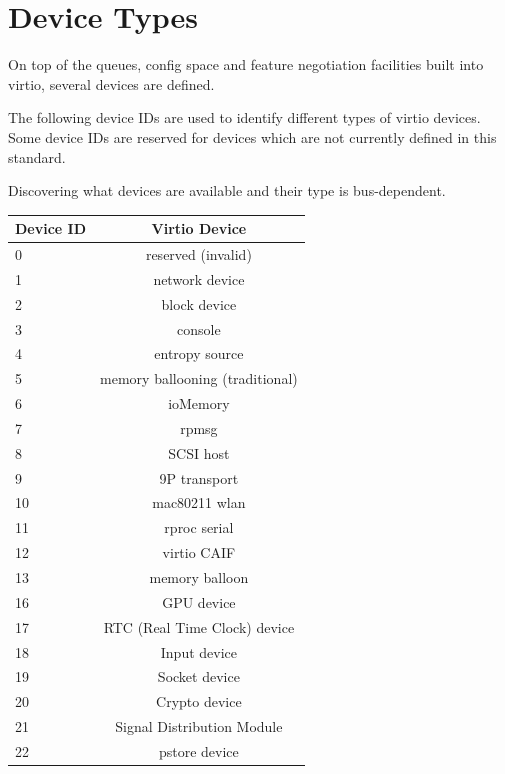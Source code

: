 \chapter{Device Types}\label{sec:Device Types}

On top of the queues, config space and feature negotiation facilities
built into virtio, several devices are defined.

The following device IDs are used to identify different types of virtio
devices.  Some device IDs are reserved for devices which are not currently
defined in this standard.

Discovering what devices are available and their type is bus-dependent.

\begin{longtable} { |l|c| }
\hline
Device ID  &  Virtio Device    \\
\hline \hline
0          & reserved (invalid) \\
\hline
1          &   network device     \\
\hline
2          &   block device     \\
\hline
3          &      console       \\
\hline
4          &  entropy source    \\
\hline
5          & memory ballooning (traditional)  \\
\hline
6          &     ioMemory       \\
\hline
7          &       rpmsg        \\
\hline
8          &     SCSI host      \\
\hline
9          &   9P transport     \\
\hline
10         &   mac80211 wlan    \\
\hline
11         &   rproc serial     \\
\hline
12         &   virtio CAIF      \\
\hline
13         &  memory balloon    \\
\hline
16         &   GPU device       \\
\hline
17         &   RTC (Real Time Clock) device \\
\hline
18         &   Input device \\
\hline
19         &   Socket device \\
\hline
20         &   Crypto device \\
\hline
21         &   Signal Distribution Module \\
\hline
22         &   pstore device \\

\end{longtable}
